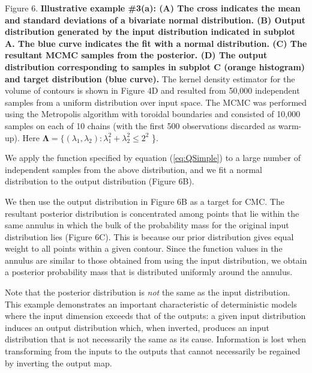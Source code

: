 \documentclass[10pt,letterpaper]{article}
\begin{document}
\vspace{0.5cm}

Figure 6. \textbf{Illustrative example \#3(a): (A) The cross indicates the mean and standard deviations of a bivariate normal distribution. (B) Output distribution generated by the input distribution indicated in subplot A. The blue curve indicates the fit with a normal distribution. (C) The resultant MCMC samples from the posterior. (D) The  output distribution corresponding to samples in subplot C (orange histogram) and target distribution (blue curve).} The kernel density estimator for the volume of contours is shown in Figure 4D and resulted from 50,000 independent samples from a uniform distribution over input space. The MCMC was performed using the Metropolis algorithm with toroidal boundaries and consisted of 10,000 samples on each of 10 chains (with the first 500 observations discarded as warm-up). Here $\boldsymbol{\Lambda} = \{ (\lambda_1,\lambda_2): \lambda_1^2+\lambda_2^2\leq2^2$ \}.

\vspace{0.5cm}

We apply the function specified by equation (\ref{eq:QSimple}) to a large number of independent samples from the above distribution, and we fit a normal distribution to the output distribution (Figure 6B).

\bigskip
{}
We then use the output distribution in Figure 6B as a target for CMC. The resultant posterior distribution is concentrated among points that lie within the same annulus in which the bulk of the probability mass for the original input distribution lies (Figure 6C). This is because our prior distribution gives equal weight to all points within a given contour. Since the function values in the annulus are similar to those obtained from using the input distribution, we obtain a posterior probability mass that is distributed uniformly around the annulus.

Note that the posterior distribution is \textit{not} the same as the input distribution. This example demonstrates an important characteristic of deterministic models where the input dimension exceeds that of the outputs: a given input distribution induces an output distribution which, when inverted, produces an input distribution that is not necessarily the same as its cause. Information is lost when transforming from the inputs to the outputs that cannot necessarily be regained by inverting the output map.


\bigskip
{}
\end{document}
